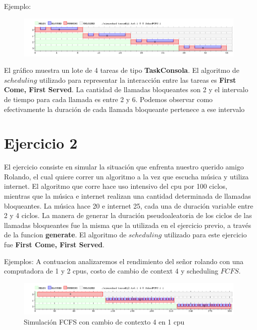 \documentclass[11pt]{article}
\begin{document}
Ejemplo: 

      \begin{figure}[H]
        \includegraphics[scale=0.5]{ejercicio1}
      \end{figure}

El gráfico muestra un lote de 4 tareas de tipo \textbf{TaskConsola}. El algoritmo de $scheduling$ utilizado para representar la interacción 
entre las tareas es \textbf{First Come, First Served}. La cantidad de llamadas bloqueantes son 2 y el intervalo de 
tiempo para cada llamada es entre 2 y 6. Podemos observar como efectivamente la duración de cada llamada bloqueante pertenece a ese 
intervalo

\newpage

\section{Ejercicio 2}

El ejercicio consiste en simular la situación que enfrenta nuestro querido amigo Rolando, el cual quiere correr un algoritmo a la vez que escucha 
música y utiliza internet. El algoritmo que corre hace uso intensivo del cpu por 100 ciclos, mientras que la música e internet realizan una 
cantidad determinada de llamadas bloqueantes. La música hace 20 e internet 25, cada una de duración variable entre 2 y 4 ciclos. La manera 
de generar la duración pseudoaleatoria de los ciclos de las llamadas bloqueantes fue la misma que la utilizada en el ejercicio previo, a través 
de la funcion \textbf{generate}. El algoritmo de $scheduling$ utilizado para este ejercicio fue \textbf{First Come, First Served}.

Ejemplos:
A contuacion analizaremos el rendimiento del señor rolando con una computadora de 1 y 2 cpus, costo de cambio de context 4 y scheduling $FCFS$.

  \begin{figure}[H]
    \includegraphics[scale=0.5]{Ejercicio2_1cpu}
    \caption{Simulación FCFS con cambio de contexto 4 en 1 cpu}
  \end{figure}
\end{document}
